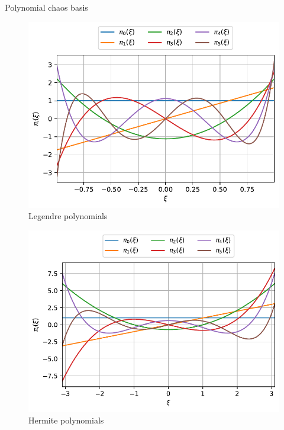 \documentclass[9pt]{beamer}
\begin{document}
\begin{frame}[t]{Polynomial chaos basis}

\begin{figure}
\begin{minipage}{.45\textwidth}
\centering
  \includegraphics[width=1.0\textwidth]{../Pics/polynomials_uniform.pdf}
  \\
  {Legendre polynomials}
\end{minipage}
\hfill
\begin{minipage}{.45\textwidth}
	\centering
  \includegraphics[width=1.0\textwidth]{../Pics/polynomials_normal.pdf}
  \\
  {Hermite polynomials}
\end{minipage}
\end{figure}


\end{frame}
\end{document}
